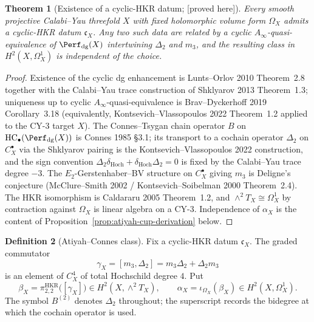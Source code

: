 \documentclass[11pt,reqno]{amsart}
\theoremstyle{plain}
\newtheorem{theorem}{Theorem}[section]
\theoremstyle{definition}
\newtheorem{definition}[theorem]{Definition}
\theoremstyle{remark}
\providecommand{\ClaimStatusProvedHere}{\textnormal{[proved here]}}
\DeclareMathOperator{\HC}{HC}
\begin{document}
\begin{theorem}[Existence of a cyclic-HKR datum; \ClaimStatusProvedHere]
\label{thm:cyclic-hkr-datum-exists}
Every smooth projective Calabi--Yau threefold $X$ with fixed
holomorphic volume form $\Omega_X$ admits a cyclic-HKR datum
$\mathfrak c_X$. Any two such data are related by a cyclic
$A_\infty$-quasi-equivalence of $\Perf_{\mathrm{dg}}(X)$ intertwining
$\Delta_2$ and $m_3$, and the resulting class in $H^2(X,\Omega^1_X)$
is independent of the choice.
\end{theorem}

\begin{proof}
Existence of the cyclic dg enhancement is Lunts--Orlov 2010
Theorem~2.8 together with the Calabi--Yau trace construction of
Shklyarov 2013 Theorem~1.3; uniqueness up to cyclic
$A_\infty$-quasi-equivalence is Brav--Dyckerhoff 2019 Corollary~3.18
(equivalently, Kontsevich--Vlassopoulos 2022 Theorem~1.2 applied to
the CY-$3$ target $X$). The Connes--Tsygan chain operator $B$ on
$\HC_\bullet(\Perf_{\mathrm{dg}}(X))$ is Connes 1985 \S3.1; its transport
to a cochain operator $\Delta_2$ on $C^\bullet_X$ via the Shklyarov
pairing is the Kontsevich--Vlassopoulos 2022 construction, and the sign
convention $\Delta_2\delta_{\mathrm{Hoch}}+\delta_{\mathrm{Hoch}}\Delta_2=0$
is fixed by the Calabi--Yau trace degree $-3$. The
$E_2$-Gerstenhaber--BV structure on $C^\bullet_X$ giving $m_3$ is
Deligne's conjecture (McClure--Smith 2002 / Kontsevich--Soibelman 2000
Theorem~2.4). The HKR isomorphism is Caldararu 2005 Theorem~1.2, and
$\wedge^2T_X\cong\Omega^1_X$ by contraction against $\Omega_X$ is
linear algebra on a CY-$3$. Independence of $\alpha_X$ is the content
of Proposition~\ref{prop:atiyah-cup-derivation} below.
\end{proof}

\begin{definition}[Atiyah--Connes class]
\label{def:atiyah-connes-class}
Fix a cyclic-HKR datum $\mathfrak c_X$. The graded commutator
\[
  \gamma_X=[m_3,\Delta_2]
  =m_3\Delta_2+\Delta_2 m_3
\]
is an element of $C^4_X$ of total Hochschild degree $4$. Put
\[
  \beta_X=\pi^{\mathrm{HKR}}_{2,2}\bigl([\gamma_X]\bigr)
  \in H^2(X,\wedge^2T_X),
  \qquad
  \alpha_X=\iota_{\Omega_X}(\beta_X)\in H^2(X,\Omega^1_X).
\]
The symbol $B^{(2)}$ denotes $\Delta_2$ throughout; the superscript
records the bidegree at which the cochain operator is used.
\end{definition}
\end{document}
